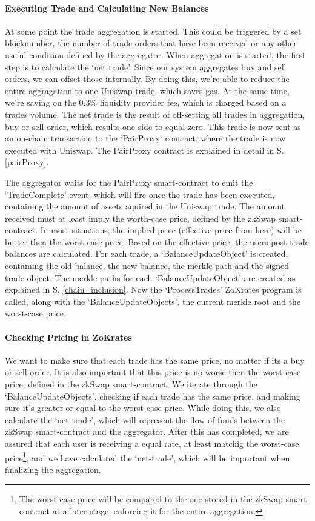 \documentclass[../../thesis.tex]{subfiles}
\begin{document}
\paragraph{Executing Trade and Calculating New Balances}
At some point the trade aggregation is started. This could be triggered by a set blocknumber, the number of trade orders that have been received or any other useful condition defined by the aggregator. When aggregation is started, the first step is to calculate the `net trade'. Since our system aggregates buy and sell orders, we can offset those internally. By doing this, we're able to reduce the entire aggragation to one Uniswap trade, which saves gas. At the same time, we're saving on the 0.3\% liquidity provider fee, which is charged based on a trades volume. The net trade is the result of off-setting all trades in aggregation, buy or sell order, which results one side to equal zero. This trade is now sent as an on-chain transaction to the `PairProxy` contract, where the trade is now executed with Uniswap. The PairProxy contract is explained in detail in S. \ref{pairProxy}. 

The aggregator waits for the PairProxy smart-contract to emit the `TradeComplete' event, which will fire once the trade has been executed, containing the amount of assets aquired in the Uniswap trade. The amount received must at least imply the worth-case price, defined by the zkSwap smart-contract. In most situations, the implied price (effective price from here) will be better then the worst-case price. Based on the effective price, the users post-trade balances are calculated. For each trade, a `BalanceUpdateObject' is created, containing the old balance, the new balance, the merkle path and the signed trade object. The merkle paths for each `BalanceUpdateObject' are created as explained in S. \ref{chain_inclusion}. Now the `ProcessTrades' ZoKrates program is called, along with the `BalanceUpdateObjects', the current merkle root and the worst-case price.

\paragraph{Checking Pricing in ZoKrates}
We want to make sure that each trade has the same price, no matter if its a buy or sell order. It is also important that this price is no worse then the worst-case price, defined in the zkSwap smart-contract. We iterate through the `BalanceUpdateObjects', checking if each trade has the same price, and making sure it's greater or equal to the worst-case price. While doing this, we also calculate the `net-trade', which will represent the flow of funds between the zkSwap smart-contract and the aggregator. After this has completed, we are assured that each user is receiving a equal rate, at least matchig the worst-case price\footnote{The worst-case price will be compared to the one stored in the zkSwap smart-contract at a later stage, enforcing it for the entire aggregation.}, and we have calculated the `net-trade', which will be important when finalizing the aggregation.
\end{document}
